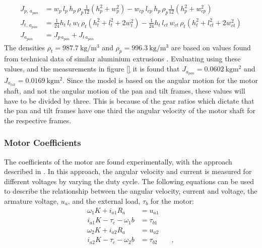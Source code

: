 \documentclass[../../main.tex]{subfiles}
\begin{document}
\begin{equation}\label{eq:pan_axis_inertia}
\begin{split}
        J_{p,\,a_{pan}} &= w_{p}\,l_{p}\,h_{p}\,\rho_{p}\frac{1}{12}(h_{p}^2+w_{p}^2)-w_{cp}\,l_{cp}\,h_{p}\,\rho_{p}\frac{1}{12}(h_{p}^2+w_{cp}^2) \\
        J_{t,\,a_{pan}} &= \frac{1}{24}h_t\,l_t\,w_t\, \rho_t (h_t^2+l_t^2+2w_t^2)-\frac{1}{24}h_t\,l_{ct}\,w_{ct}\, \rho_t (h_t^2+l_{ct}^2+2w_{ct}^2)
        \\
        J_{a_{pan}} &= J_{p\,a_{pan}} + J_{t\,a_{pan}}
\end{split}
\end{equation}
The densities $\rho_t = \SI{987.7 }{\kilo \gram \per \cubic \meter }$ and $\rho_p = \SI{996.3 }{\kilo \gram \per \cubic \meter } $ are based on values found from technical data of similar aluminium extrusions \cite{extrusion45x45} \cite{extrusion40x40}.
Evaluating using these values, and the measurements in figure \ref{} it is found that $J_{a_{pan}} = \SI{0.0602}{\kilo \gram \square \meter } $ and $J_{a_{tilt}} = \SI{0.0169}{\kilo \gram \square \meter }$. Since the model is based on the angular motion for the motor shaft, and not the angular motion of the pan and tilt frames, these values will have to be divided by three. This is because of the gear ratios which dictate that the pan and tilt frames have one third the angular velocity of the motor shaft for the respective frames.

\subsubsection*{ Motor Coefficients }
The coefficients of the motor are found experimentally, with the approach described in \cite{PalleAndersenModeldannelse}. In this approach, the angular velocity and current is measured for different voltages by varying the duty cycle. The following equations can be used to describe the relationship between the angular velocity, current and voltage, the armature voltage, $u_a$, and the external load, $\tau_b$ for the motor:
\begin{align*}
    \omega_{1} K + i_{a1} R_{a} &= u_{a1}  \\
    i_{a1} K - \tau_{c} - \omega_{1} b &= \tau_{b1} \\
    \omega_{2} K + i_{a2} R_{a} &= u_{a2} \\
    i_{a2} K - \tau_{c} - \omega_{2} b &= \tau_{b2} \qquad ,
\end{align*}
\end{document}
